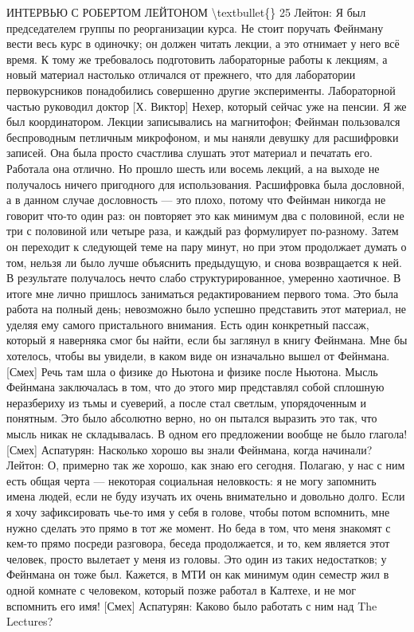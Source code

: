 \documentclass[10pt,oneside]{article}
\begin{document}
ИНТЕРВЬЮ С РОБЕРТОМ ЛЕЙТОНОМ \textbackslash{}textbullet\{\} 25 Лейтон: Я был председателем группы по реорганизации курса. Не стоит поручать Фейнману вести весь курс в одиночку; он должен читать лекции, а это отнимает у него всё время. К тому же требовалось подготовить лабораторные работы к лекциям, а новый материал настолько отличался от прежнего, что для лаборатории первокурсников понадобились совершенно другие эксперименты. Лабораторной частью руководил доктор [Х. Виктор] Нехер, который сейчас уже на пенсии. Я же был координатором. Лекции записывались на магнитофон; Фейнман пользовался беспроводным петличным микрофоном, и мы наняли девушку для расшифровки записей. Она была просто счастлива слушать этот материал и печатать его. Работала она отлично. Но прошло шесть или восемь лекций, а на выходе не получалось ничего пригодного для использования. Расшифровка была дословной, а в данном случае дословность --- это плохо, потому что Фейнман никогда не говорит что-то один раз: он повторяет это как минимум два с половиной, если не три с половиной или четыре раза, и каждый раз формулирует по-разному. Затем он переходит к следующей теме на пару минут, но при этом продолжает думать о том, нельзя ли было лучше объяснить предыдущую, и снова возвращается к ней. В результате получалось нечто слабо структурированное, умеренно хаотичное. В итоге мне лично пришлось заниматься редактированием первого тома. Это была работа на полный день; невозможно было успешно представить этот материал, не уделяя ему самого пристального внимания. Есть один конкретный пассаж, который я наверняка смог бы найти, если бы заглянул в книгу Фейнмана. Мне бы хотелось, чтобы вы увидели, в каком виде он изначально вышел от Фейнмана. [Смех] Речь там шла о физике до Ньютона и физике после Ньютона. Мысль Фейнмана заключалась в том, что до этого мир представлял собой сплошную неразбериху из тьмы и суеверий, а после стал светлым, упорядоченным и понятным. Это было абсолютно верно, но он пытался выразить это так, что мысль никак не складывалась. В одном его предложении вообще не было глагола! [Смех] Аспатурян: Насколько хорошо вы знали Фейнмана, когда начинали? Лейтон: О, примерно так же хорошо, как знаю его сегодня. Полагаю, у нас с ним есть общая черта --- некоторая социальная неловкость: я не могу запомнить имена людей, если не буду изучать их очень внимательно и довольно долго. Если я хочу зафиксировать чье-то имя у себя в голове, чтобы потом вспомнить, мне нужно сделать это прямо в тот же момент. Но беда в том, что меня знакомят с кем-то прямо посреди разговора, беседа продолжается, и то, кем является этот человек, просто вылетает у меня из головы. Это один из таких недостатков; у Фейнмана он тоже был. Кажется, в МТИ он как минимум один семестр жил в одной комнате с человеком, который позже работал в Калтехе, и не мог вспомнить его имя! [Смех] Аспатурян: Каково было работать с ним над The Lectures?\par
\end{document}

